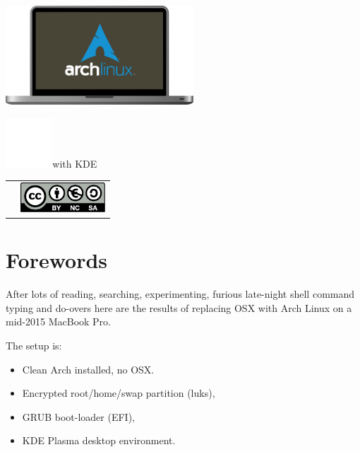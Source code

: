 \vspace*{\fill}
\includegraphics[height=10em]{img/ArchMBP.pdf}\linebreak
\begin{mdframed}[style=titlebox]
	\centering
	\begin{Huge}
		\par
	\end{Huge}
\end{mdframed}
\vspace*{2em}
\includegraphics[height=5em]{img/kde-logo.pdf}with KDE\par
\vspace*{\fill}
\begin{tabularx}{0.95\textwidth}{lR}
	& \includegraphics[height=3em]{../common/licenses/by-nc-sa_eu.pdf}
\end{tabularx}
\vspace*{2em}

\setcounter{page}{1}
\pagecolor{white}
\color{dark}
\normalsize\justify
\tableofcontents
\clearpage

\clearpage
\section{Forewords}

After lots of reading, searching, experimenting, furious late-night shell command typing and do-overs here are the results of replacing OSX with Arch Linux on a mid-2015 MacBook Pro.

The setup is:
\begin{itemize}[noitemsep,topsep=0pt,leftmargin=*]
	\item Clean Arch installed, no OSX.
	\item Encrypted root/home/swap partition (luks),
	\item GRUB boot-loader (EFI),
	\item KDE Plasma desktop environment.
\end{itemize}

